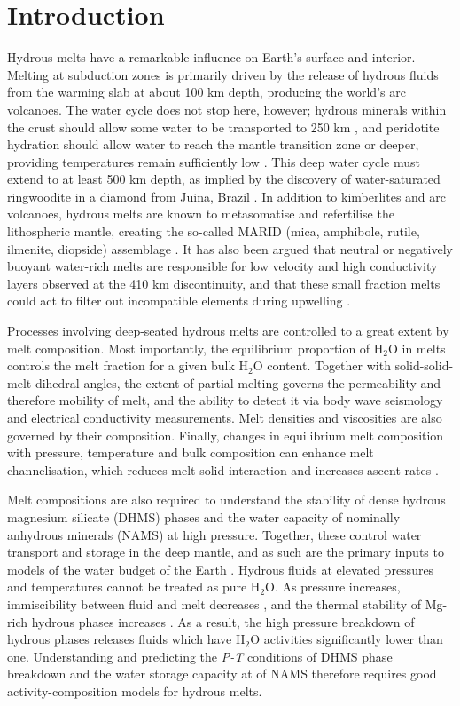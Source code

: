 \documentclass[review]{elsarticle}
\begin{document}
\linenumbers

\section{Introduction}
Hydrous melts have a remarkable influence on Earth's surface and interior. Melting at subduction zones is primarily driven by the release of hydrous fluids from the warming slab at about 100 km depth, producing the world's arc volcanoes. The water cycle does not stop here, however; hydrous minerals within the crust should allow some water to be transported to 250 km \citep{PS2002}, and peridotite hydration should allow water to reach the mantle transition zone or deeper, providing temperatures remain sufficiently low \citep{KOM2005}. This deep water cycle must extend to at least 500 km depth, as implied by the discovery of water-saturated ringwoodite in a diamond from Juina, Brazil \citep{Pearsonetal2014}. In addition to kimberlites and arc volcanoes, hydrous melts are known to metasomatise and refertilise the lithospheric mantle, creating the so-called MARID (mica, amphibole, rutile, ilmenite, diopside) assemblage \citep{GHKR2010}. It has also been argued that neutral or negatively buoyant water-rich melts are responsible for low velocity and high conductivity layers observed at the 410 km discontinuity, and that these small fraction melts could act to filter out incompatible elements during upwelling \citep{BK2003}. 

Processes involving deep-seated hydrous melts are controlled to a great extent by melt composition. Most importantly, the equilibrium proportion of H$_2$O in melts controls the melt fraction for a given bulk H$_2$O content. Together with solid-solid-melt dihedral angles, the extent of partial melting governs the permeability and therefore mobility of melt, and the ability to detect it via body wave seismology and electrical conductivity measurements. Melt densities and viscosities are also governed by their composition. Finally, changes in equilibrium melt composition with pressure, temperature and bulk composition can enhance melt channelisation, which reduces melt-solid interaction and increases ascent rates \citep[e.g.][]{SKA2001,WK2012}. 

Melt compositions are also required to understand the stability of dense hydrous magnesium silicate (DHMS) phases and the water capacity of nominally anhydrous minerals (NAMS) at high pressure. Together, these control water transport and storage in the deep mantle, and as such are the primary inputs to models of the water budget of the Earth \citep{Hirschmann2006}. Hydrous fluids at elevated pressures and temperatures cannot be treated as pure H$_2$O. As pressure increases, immiscibility between fluid and melt decreases \citep{MSUP2007, SUTG2001, HM2012}, and the thermal stability of Mg-rich hydrous phases increases \citep{KO2006}. As a result, the high pressure breakdown of hydrous phases releases fluids which have H$_2$O activities significantly lower than one. Understanding and predicting the \emph{P-T} conditions of DHMS phase breakdown and the water storage capacity at of NAMS therefore requires good activity-composition models for hydrous melts.
\end{document}
